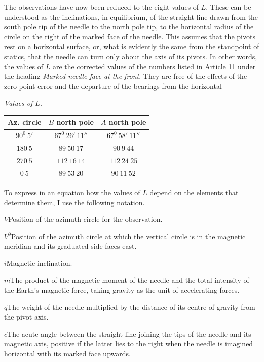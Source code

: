 The observations have now been reduced to the eight values of $L$. These can be understood as the inclinations, in equilibrium, of the straight line drawn from the south pole tip of the needle to the north pole tip, to the horizontal radius of the circle on the right of the marked face of the needle. This assumes that the pivots rest on a horizontal surface, or, what is evidently the same from the standpoint of statics, that the needle can turn only about the axis of its pivots. In other words, the values of $L$ are the corrected values of the numbers listed in Article 11 under the heading \textit{Marked needle face at the front}. They are free of the effects of the zero-point error and the departure of the bearings from the horizontal
\begin{center}
\textit{Values of $L$.}\par\smallskip
\begin{tabular}{c|c|c}
Az. circle&$B$ north pole&$A$ north pole\\\hline
$90^0\ 5'$&$67^0\ 26'\ 11''$&$67^0\ 58'\ 11''$\\
$180\ 5$&$89\ 50\ 17$&$90\ 9\ 44$\\
$270\ 5$&$112\ 16\ 14$&$112\ 24\ 25$\\
$0\ 5$&$89\ 53\ 20$&$90\ 11\ 52$
\end{tabular}
\end{center}

To express in an equation how the values of $L$ depend on the elements that determine them, I use the following notation.

$V$\quad Position of the azimuth circle for the observation.

$V^0$\quad Position of the azimuth circle at which the vertical circle is in the magnetic meridian and its graduated side faces east.

$i$\quad Magnetic inclination.


$m$\quad The product of the magnetic moment of the needle and the total intensity of the Earth's magnetic force, taking gravity as the unit of accelerating forces.

$q$\quad The weight of the needle multiplied by the distance of its centre of gravity from the pivot axis.

$c$\quad The acute angle between the straight line joining the tips of the needle and its magnetic axis, positive if the latter lies to the right when the needle is imagined horizontal with its marked face upwards.

